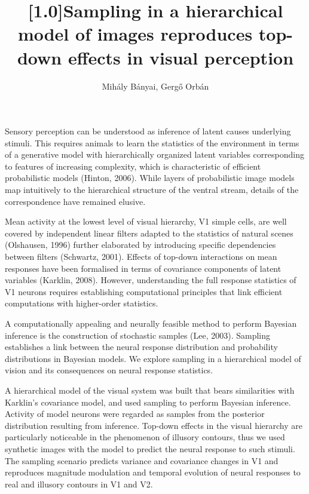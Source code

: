 \documentclass[12pt,a4paper]{article}
\date{}
\title{\vspace{-15mm}\scalebox{0.9}[1.0]{Sampling in a hierarchical model of images reproduces top-down effects in visual perception}}
\author{\vspace{-2mm}Mih\'aly B\'anyai, Gerg\H{o} Orb\'an}
\affil{\vspace{-3mm}Computational Systems Neuroscience Lab, Wigner Research Centre for Physics, Budapest, Hungary}
\begin{document}
\maketitle
\thispagestyle{empty}

\vspace{-5mm}

Sensory perception can be understood as inference of latent causes underlying stimuli. This requires animals to learn the statistics of the environment in terms of a generative model with hierarchically organized latent variables corresponding to features of increasing complexity, which is characteristic of efficient probabilistic models (Hinton, 2006). While layers of probabilistic image models map intuitively to the hierarchical structure of the ventral stream, details of the correspondence have remained elusive.

Mean activity at the lowest level of visual hierarchy, V1 simple cells, are well covered by independent linear filters adapted to the statistics of natural scenes (Olshausen, 1996) further elaborated by introducing specific  dependencies between filters (Schwartz, 2001). Effects of top-down interactions on mean responses have been formalised in terms of covariance components of latent variables (Karklin, 2008). However, understanding the full response statistics of V1 neurons requires establishing computational principles that link efficient computations with higher-order statistics.

A computationally appealing and neurally feasible method to perform Bayesian inference is the construction of stochastic samples (Lee, 2003). Sampling establishes a link between the neural response distribution and probability distributions in Bayesian models. We explore sampling in a hierarchical model of vision and its consequences on neural response statistics.  

A hierarchical model of the visual system was built that bears similarities with Karklin's covariance model, and used sampling to perform Bayesian inference. Activity of model neurons were regarded as samples from the posterior distribution resulting from inference. Top-down effects in the visual hierarchy are particularly noticeable in the phenomenon of illusory contours, thus we used synthetic images with the model to predict the neural response to such stimuli. The sampling scenario predicts variance and covariance changes in V1 and reproduces magnitude modulation and temporal evolution of neural responses to real and illusory contours in V1 and V2. 
\end{document}
